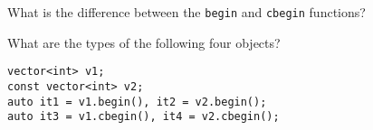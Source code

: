 %
%
\begin{question}
 What is the difference between the \verb|begin| and \verb|cbegin| functions?
\end{question}

\begin{question}
What are the types of the following four objects?
\begin{lstlisting}
vector<int> v1;
const vector<int> v2;
auto it1 = v1.begin(), it2 = v2.begin();
auto it3 = v1.cbegin(), it4 = v2.cbegin();
\end{lstlisting}
\end{question}
